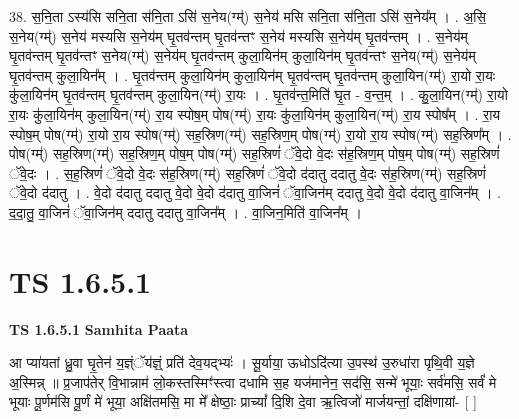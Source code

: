 \documentclass[17pt]{extarticle}
\begin{document}
38. स॒नि॒ता ऽस्य॑सि सनि॒ता स॑नि॒ता ऽसि॑ स॒नेय(ग्म्॑) स॒नेय॑ मसि सनि॒ता स॑नि॒ता ऽसि॑ स॒नेय᳚म् । . अ॒सि॒ स॒नेय(ग्म्॑) स॒नेय॑ मस्यसि स॒नेय॑म् घृ॒तव॑न्तम् घृ॒तव॑न्तꣳ स॒नेय॑ मस्यसि स॒नेय॑म् घृ॒तव॑न्तम् । . स॒नेय॑म् घृ॒तव॑न्तम् घृ॒तव॑न्तꣳ स॒नेय(ग्म्॑) स॒नेय॑म् घृ॒तव॑न्तम् कुला॒यिन॑म् कुला॒यिन॑म् घृ॒तव॑न्तꣳ स॒नेय(ग्म्॑) स॒नेय॑म् घृ॒तव॑न्तम् कुला॒यिन᳚म् । . घृ॒तव॑न्तम् कुला॒यिन॑म् कुला॒यिन॑म् घृ॒तव॑न्तम् घृ॒तव॑न्तम् कुला॒यिन(ग्म्॑) रा॒यो रा॒यः कु॑ला॒यिन॑म् घृ॒तव॑न्तम् घृ॒तव॑न्तम् कुला॒यिन(ग्म्॑) रा॒यः । . घृ॒तव॑न्त॒मिति॑ घृ॒त - व॒न्त॒म् । . कु॒ला॒यिन(ग्म्॑) रा॒यो रा॒यः कु॑ला॒यिन॑म् कुला॒यिन(ग्म्॑) रा॒य स्पोष॒म् पोष(ग्म्॑) रा॒यः कु॑ला॒यिन॑म् कुला॒यिन(ग्म्॑) रा॒य स्पोष᳚म् । . रा॒य स्पोष॒म् पोष(ग्म्॑) रा॒यो रा॒य स्पोष(ग्म्॑) सह॒स्रिण(ग्म्॑) सह॒स्रिण॒म् पोष(ग्म्॑) रा॒यो रा॒य स्पोष(ग्म्॑) सह॒स्रिण᳚म् । . पोष(ग्म्॑) सह॒स्रिण(ग्म्॑) सह॒स्रिण॒म् पोष॒म् पोष(ग्म्॑) सह॒स्रिणं॑ ॅवे॒दो वे॒दः स॑ह॒स्रिण॒म् पोष॒म् पोष(ग्म्॑) सह॒स्रिणं॑ ॅवे॒दः । . स॒ह॒स्रिणं॑ ॅवे॒दो वे॒दः स॑ह॒स्रिण(ग्म्॑) सह॒स्रिणं॑ ॅवे॒दो द॑दातु ददातु वे॒दः स॑ह॒स्रिण(ग्म्॑) सह॒स्रिणं॑ ॅवे॒दो द॑दातु । . वे॒दो द॑दातु ददातु वे॒दो वे॒दो द॑दातु वा॒जिनं॑ ॅवा॒जिन॑म् ददातु वे॒दो वे॒दो द॑दातु वा॒जिन᳚म् । . द॒दा॒तु॒ वा॒जिनं॑ ॅवा॒जिन॑म् ददातु ददातु वा॒जिन᳚म् । . वा॒जिन॒मिति॑ वा॒जिन᳚म् । \newline
\pagebreak
{}

\section{ TS 1.6.5.1 }

\textbf{TS 1.6.5.1 } \newline
\textbf{Samhita Paata} \newline

आ प्या॑यतां ध्रु॒वा घृ॒तेन॑ य॒ज्ञ्ंॅय॑ज्ञ्ं॒ प्रति॑ देव॒यद्भ्यः॑ । सू॒र्याया॒ ऊधोऽदि॑त्या उ॒पस्थ॑ उ॒रुधा॑रा पृथि॒वी य॒ज्ञे अ॒स्मिन्न् ॥ प्र॒जाप॑तेर् वि॒भान्नाम॑ लो॒कस्तस्मिꣳ॑स्त्वा दधामि स॒ह यज॑मानेन॒ सद॑सि॒ सन्मे॑ भूयाः॒ सर्व॑मसि॒ सर्वं॑ मे भूयाः पू॒र्णम॑सि पू॒र्णं मे॑ भूया॒ अक्षि॑तमसि॒ मा मे᳚ क्षेष्ठाः॒ प्राच्यां᳚ दि॒शि दे॒वा ऋ॒त्विजो॑ मार्जयन्तां॒ दक्षि॑णायां- [ ] \newline
\end{document}

